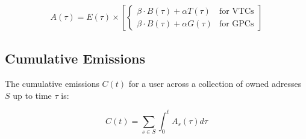 \documentclass[11pt]{report}
\begin{document}
\begin{align}
    A(\tau) = E(\tau) \times \left[\begin{cases}
                                           \beta \cdot B(\tau) + \alpha T(\tau)  & \text{for VTCs} \\
                                           \beta \cdot B(\tau) +  \alpha G(\tau) & \text{for GPCs}
                                       \end{cases}\right]
\end{align}








\subsection*{Cumulative Emissions}

The cumulative emissions $C(t)$ for a user across a collection of owned adresses $S$ up to time $\tau$ is:

\begin{equation}
    C(t) = \sum_{s \in S} \int_{0}^{t} A_s(\tau) d\tau
\end{equation}
\end{document}
